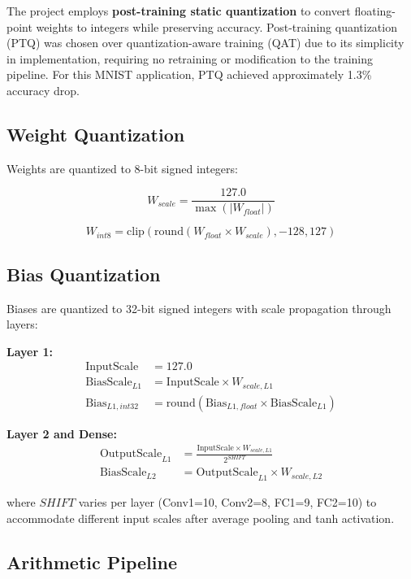 \documentclass[12pt,a4paper]{report}
\begin{document}
The project employs \textbf{post-training static quantization} to convert floating-point weights to integers while preserving accuracy. Post-training quantization (PTQ) was chosen over quantization-aware training (QAT) due to its simplicity in implementation, requiring no retraining or modification to the training pipeline. For this MNIST application, PTQ achieved approximately 1.3\% accuracy drop.

\subsection{Weight Quantization}

Weights are quantized to 8-bit signed integers:

\begin{equation}
W_{scale} = \frac{127.0}{\max(|W_{float}|)}
\end{equation}

\begin{equation}
W_{int8} = \text{clip}\left(\text{round}(W_{float} \times W_{scale}), -128, 127\right)
\end{equation}

\subsection{Bias Quantization}

Biases are quantized to 32-bit signed integers with scale propagation through layers:

\textbf{Layer 1:}
\begin{align}
\text{InputScale} &= 127.0 \\
\text{BiasScale}_{L1} &= \text{InputScale} \times W_{scale,L1} \\
\text{Bias}_{L1,int32} &= \text{round}(\text{Bias}_{L1,float} \times \text{BiasScale}_{L1})
\end{align}

\textbf{Layer 2 and Dense:}
\begin{align}
\text{OutputScale}_{L1} &= \frac{\text{InputScale} \times W_{scale,L1}}{2^{SHIFT}} \\
\text{BiasScale}_{L2} &= \text{OutputScale}_{L1} \times W_{scale,L2}
\end{align}

where $SHIFT$ varies per layer (Conv1=10, Conv2=8, FC1=9, FC2=10) to accommodate different input scales after average pooling and tanh activation.

\subsection{Arithmetic Pipeline}
\end{document}
